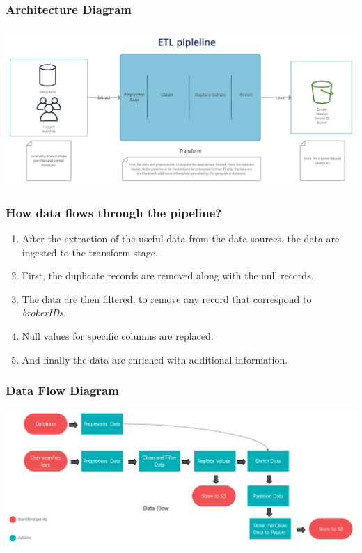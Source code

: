 \documentclass{beamer}
\begin{document}
\begin{frame}
\frametitle{Architecture Diagram}
\centering
\includegraphics[scale=0.11]{ETL_arch.png}
\end{frame}

\begin{frame}
\frametitle{How data flows through the pipeline?}
\begin{enumerate}
\item After the extraction of the useful data from the data sources, the data are ingested to the transform stage.
\item First, the duplicate records are removed along with the null records.
\item The data are then filtered, to remove any record that correspond to \textit{brokerIDs}.
\item Null values for specific columns are replaced.
\item And finally the data are enriched with additional information.
\end{enumerate}
\end{frame}

\begin{frame}
\frametitle{Data Flow Diagram}
\centering
\includegraphics[scale=0.09]{dataFlow.png}
\end{frame}
\end{document}
